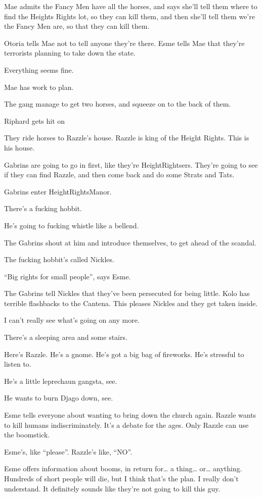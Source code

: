 Mae admits the Fancy Men have all the horses, and says she’ll tell them where to find the Heights Rights lot, so they can kill them, and then she’ll tell them we’re the Fancy Men are, so that they can kill them.

Otoria tells Mae not to tell anyone they’re there. Esme tells Mae that they’re terrorists planning to take down the state.

Everything seems fine.

Mae has work to plan.

The gang manage to get two horses, and squeeze on to the back of them.

Riphard gets hit on

They ride horses to Razzle’s house. Razzle is king of the Height Rights. This is his house.

Gabrins are going to go in first, like they’re HeightRightsers. They’re going to see if they can find Razzle, and then come back and do some Strats and Tats.

Gabrins enter HeightRightsManor.

There’s a fucking hobbit.

He’s going to fucking whistle like a bellend.

The Gabrins shout at him and introduce themselves, to get ahead of the scandal.

The fucking hobbit’s called Nickles.

“Big rights for small people”, says Esme.

The Gabrins tell Nickles that they’ve been persecuted for being little. Kolo has terrible flashbacks to the Cantena. This pleases Nickles and they get taken inside.

I can’t really see what’s going on any more.

There’s a sleeping area and some stairs.

Here’s Razzle. He’s a gnome. He’s got a big bag of fireworks. He’s stressful to listen to.

He’s a little leprechaun gangsta, see.

He wants to burn Djago down, see.

Esme tells everyone about wanting to bring down the church again. Razzle wants to kill humans indiscriminately. It’s a debate for the ages. Only Razzle can use the boomstick.

Esme’s, like “please”. Razzle’s like, “NO”.

Esme offers information about booms, in return for… a thing… or… anything. Hundreds of short people will die, but I think that’s the plan. I really don’t understand. It definitely sounds like they’re not going to kill this guy.

